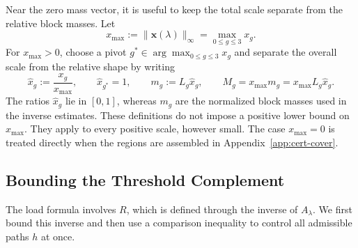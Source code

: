 \documentclass[11pt]{article}
\theoremstyle{definition}
\theoremstyle{remark}
\begin{document}
Near the zero mass vector, it is useful to keep the total scale
separate from the relative block masses.
Let
\begin{equation}\label{eq:cert-scale}
 x_{\max}:=\|\mathbf x(\lambda)\|_\infty
 =\max_{0\le g\le3}x_g.
\end{equation}
For $x_{\max}>0$, choose a pivot
$
 g^*\in\arg\max_{0\le g\le3}x_g$
and separate the overall scale from the relative shape by writing
\begin{equation}\label{eq:cert-normalized-masses}
 \hat x_g:=\frac{x_g}{x_{\max}},
 \qquad
 \hat x_{g^*}=1,
 \qquad
 m_g:=L_g\hat x_g,
 \qquad
 M_g=x_{\max}m_g=x_{\max}L_g\hat x_g.
\end{equation}
The ratios $\hat x_g$ lie in $[0,1]$, whereas $m_g$ are the normalized block
masses used in the inverse estimates.
These definitions do not impose a positive lower bound on
$x_{\max}$.  They apply to every positive scale, however small.
The case $x_{\max}=0$ is treated directly when the regions are assembled
in Appendix~\ref{app:cert-cover}.

\subsection{Bounding the Threshold Complement}\label{sec:cert-comparisons}

The load formula involves $R$, which is defined through the inverse
of $A_\lambda$.  We first bound this inverse and then use a comparison
inequality to control all admissible paths $h$ at once.
\end{document}
